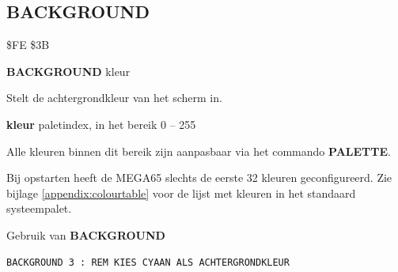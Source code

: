 \subsection{BACKGROUND}
\begin{description}[leftmargin=2cm,style=nextline]
\item [Token:]   \$FE \$3B

\item [Formaat:]  {\bf BACKGROUND} kleur

\item [Gebruik:]   Stelt de achtergrondkleur van het scherm in.

                 {\bf kleur} paletindex, in het bereik 0 -- 255

                 Alle kleuren binnen dit bereik zijn aanpasbaar via het commando {\bf PALETTE}.

                 Bij opstarten heeft de MEGA65 slechts de eerste 32 kleuren geconfigureerd. Zie bijlage \vref{appendix:colourtable} voor de lijst met kleuren in het standaard systeempalet.

\item [Voorbeeld:] Gebruik van {\bf BACKGROUND}

\begin{tcolorbox}[colback=black,coltext=white]
\verbatimfont{\codefont}
\begin{verbatim}
BACKGROUND 3 : REM KIES CYAAN ALS ACHTERGRONDKLEUR
\end{verbatim}
\end{tcolorbox}
\end{description}


\newpage
